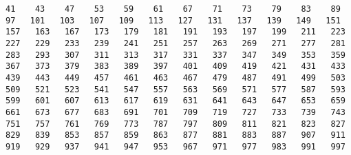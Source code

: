 \documentclass[11pt, oneside]{article}
\begin{document}
\begin{lstlisting}
41    43    47    53    59    61    67    71    73    79    83    89
97   101   103   107   109   113   127   131   137   139   149   151
157   163   167   173   179   181   191   193   197   199   211   223
227   229   233   239   241   251   257   263   269   271   277   281
283   293   307   311   313   317   331   337   347   349   353   359
367   373   379   383   389   397   401   409   419   421   431   433
439   443   449   457   461   463   467   479   487   491   499   503
509   521   523   541   547   557   563   569   571   577   587   593
599   601   607   613   617   619   631   641   643   647   653   659
661   673   677   683   691   701   709   719   727   733   739   743
751   757   761   769   773   787   797   809   811   821   823   827
829   839   853   857   859   863   877   881   883   887   907   911
919   929   937   941   947   953   967   971   977   983   991   997
\end{lstlisting}
\end{document}
